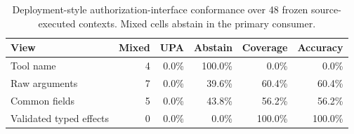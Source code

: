 \begin{table}[t]
\centering
\small
\caption{Deployment-style authorization-interface conformance over 48 frozen source-executed contexts. Mixed cells abstain in the primary consumer.}
\label{tab:deployment-authz-interface}
\begin{tabular}{lrrrrr}
\toprule
View & Mixed & UPA & Abstain & Coverage & Accuracy \\
\midrule
Tool name & 4 & 0.0\% & 100.0\% & 0.0\% & 0.0\% \\
Raw arguments & 7 & 0.0\% & 39.6\% & 60.4\% & 60.4\% \\
Common fields & 5 & 0.0\% & 43.8\% & 56.2\% & 56.2\% \\
Validated typed effects & 0 & 0.0\% & 0.0\% & 100.0\% & 100.0\% \\
\bottomrule
\end{tabular}
\end{table}
